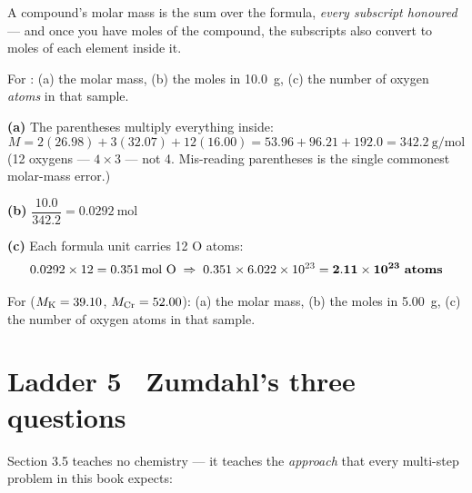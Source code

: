 \documentclass{apchem-worksheet}
\begin{document}
A compound's molar mass is the sum over the formula, \emph{every
subscript honoured} --- and once you have moles of the compound, the
subscripts also convert to moles of each element inside it.

\begin{workedexample}
For : (a) the molar mass, (b) the moles in
\SI{10.0}{\gram}, (c) the number of oxygen \emph{atoms} in that sample.

\textbf{(a)} The parentheses multiply everything inside:
\[ M = 2(26.98) + 3(32.07) + 12(16.00)
     = 53.96 + 96.21 + 192.0 = \SI{342.2}{\gram\per\mole} \]
(12 oxygens --- $4 \times 3$ --- not 4. Mis-reading parentheses is the
single commonest molar-mass error.)

\textbf{(b)} $\dfrac{10.0}{342.2} = \SI{0.0292}{\mole}$

\textbf{(c)} Each formula unit carries 12 O atoms:
\[ 0.0292 \times 12 = \SI{0.351}{\mole}~\ce{O}
   \;\Rightarrow\; 0.351 \times 6.022\times10^{23}
   = \mathbf{2.11\times10^{23}~atoms} \]
\end{workedexample}

\begin{yourturn}
For  ($M_{\ce{K}} = 39.10$, $M_{\ce{Cr}} = 52.00$):
(a) the molar mass, (b) the moles in \SI{5.00}{\gram}, (c) the number of
oxygen atoms in that sample. \workspace[3.4cm]
\end{yourturn}

\section*{\sffamily Ladder 5 \textbullet\ Zumdahl's three questions}

Section 3.5 teaches no chemistry --- it teaches the \emph{approach} that
every multi-step problem in this book expects:

\begin{center}
\end{center}
\end{document}
